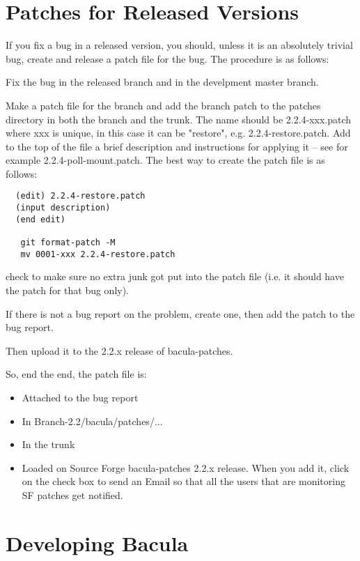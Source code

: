 \section{Patches for Released Versions}
If you fix a bug in a released version, you should, unless it is
an absolutely trivial bug, create and release a patch file for the
bug.  The procedure is as follows:

Fix the bug in the released branch and in the develpment master branch.

Make a patch file for the branch and add the branch patch to 
the patches directory in both the branch and the trunk.
The name should be 2.2.4-xxx.patch  where xxx is unique, in this case it can 
be "restore", e.g. 2.2.4-restore.patch.  Add to the top of the
file  a brief description and instructions for applying it -- see for example 
2.2.4-poll-mount.patch.  The best way to create the patch file is as
follows:

\begin{verbatim}
  (edit) 2.2.4-restore.patch
  (input description)
  (end edit)

   git format-patch -M
   mv 0001-xxx 2.2.4-restore.patch
\end{verbatim}

check to make sure no extra junk got put into the patch file (i.e.
it should have the patch for that bug only).

If there is not a bug report on the problem, create one, then add the
patch to the bug report. 

Then upload it to the 2.2.x release of bacula-patches.

So, end the end, the patch file is:
\begin{itemize}
\item Attached to the bug report

\item In Branch-2.2/bacula/patches/...

\item In the trunk

\item Loaded on Source Forge bacula-patches 2.2.x release. When
   you add it, click on the check box to send an Email so that all the
   users that are monitoring SF patches get notified.
\end{itemize}


\section{Developing Bacula}

